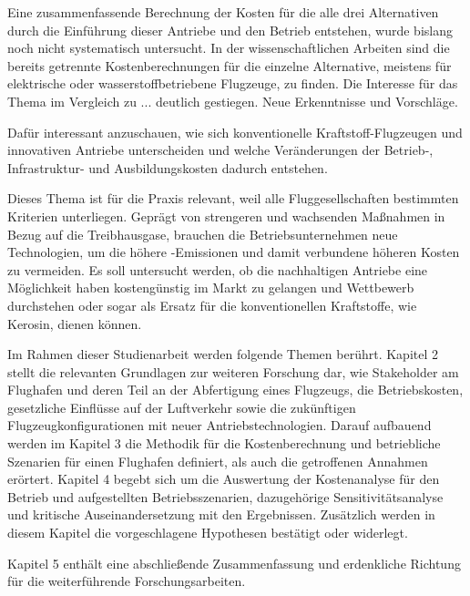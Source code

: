 Eine zusammenfassende Berechnung der Kosten für die alle drei Alternativen durch die Einführung dieser Antriebe und den Betrieb entstehen, 
wurde bislang noch nicht systematisch
untersucht. In der wissenschaftlichen Arbeiten sind die bereits getrennte Kostenberechnungen für die einzelne Alternative, meistens für 
elektrische oder wasserstoffbetriebene Flugzeuge, zu finden. Die Interesse für das Thema im Vergleich zu ... deutlich gestiegen.
Neue Erkenntnisse und Vorschläge.

Dafür interessant anzuschauen, wie sich konventionelle Kraftstoff-Flugzeugen und innovativen Antriebe unterscheiden 
und welche Veränderungen der Betrieb-, Infrastruktur- und Ausbildungskosten dadurch entstehen.

Dieses Thema ist für die Praxis relevant, weil alle Fluggesellschaften bestimmten Kriterien unterliegen. 
Geprägt von strengeren und wachsenden Maßnahmen in Bezug auf die Treibhausgase, brauchen die Betriebsunternehmen neue Technologien, um die  
höhere -Emissionen und damit verbundene höheren Kosten zu vermeiden.
Es soll untersucht werden, ob die nachhaltigen Antriebe eine Möglichkeit haben kostengünstig im Markt zu gelangen und Wettbewerb durchstehen oder 
sogar als Ersatz für die konventionellen Kraftstoffe, wie Kerosin, dienen können.

Im Rahmen dieser Studienarbeit werden folgende Themen berührt.
Kapitel 2 stellt die relevanten Grundlagen zur weiteren Forschung dar, wie Stakeholder am Flughafen und deren Teil an der Abfertigung eines Flugzeugs,
die Betriebskosten, gesetzliche Einflüsse auf der Luftverkehr sowie die zukünftigen Flugzeugkonfigurationen mit neuer Antriebstechnologien.
Darauf aufbauend werden im Kapitel 3 die Methodik für die Kostenberechnung und betriebliche Szenarien für einen Flughafen definiert, 
als auch die getroffenen Annahmen erörtert.
Kapitel 4 begebt sich um die Auswertung der Kostenanalyse für den Betrieb und aufgestellten Betriebsszenarien, dazugehörige Sensitivitätsanalyse und
kritische Auseinandersetzung mit den Ergebnissen. Zusätzlich werden in diesem Kapitel die vorgeschlagene Hypothesen bestätigt oder widerlegt.

Kapitel 5 enthält eine abschließende Zusammenfassung und erdenkliche Richtung für die weiterführende Forschungsarbeiten.
